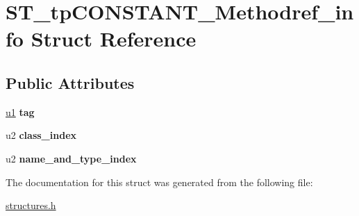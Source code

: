 \hypertarget{structST__tpCONSTANT__Methodref__info}{}\section{S\+T\+\_\+tp\+C\+O\+N\+S\+T\+A\+N\+T\+\_\+\+Methodref\+\_\+info Struct Reference}
\label{structST__tpCONSTANT__Methodref__info}
\subsection*{Public Attributes}
\begin{DoxyCompactItemize}
\item 
\mbox{\label{structST__tpCONSTANT__Methodref__info_a4c212ecc227e0e32c11f1b3ccd602df3}} 
\mbox{\hyperlink{structures_8h_ad9f4cdb6757615aae2fad89dab3c5470}{u1}} {\bfseries tag}
\item 
\mbox{\label{structST__tpCONSTANT__Methodref__info_a97f519e8d7ecaa3228676c94fc0bcc0c}} 
u2 {\bfseries class\+\_\+index}
\item 
\mbox{\label{structST__tpCONSTANT__Methodref__info_a88bd2947f59669f48d4e200bf6e0477f}} 
u2 {\bfseries name\+\_\+and\+\_\+type\+\_\+index}
\end{DoxyCompactItemize}


The documentation for this struct was generated from the following file\+:\begin{DoxyCompactItemize}
\item 
\mbox{\hyperlink{structures_8h}{structures.\+h}}\end{DoxyCompactItemize}
